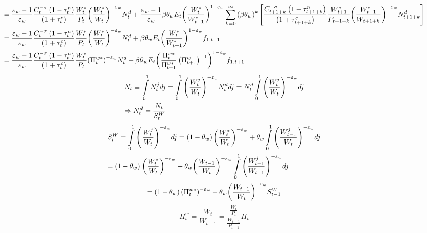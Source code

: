 \documentclass[12pt,a4paper]{article}
\begin{document}
\[\begin{gathered}
   = \frac{{{\varepsilon _w} - 1}}{{{\varepsilon _w}}}\frac{{C_t^{ - \sigma }\left( {1 - \tau _t^n} \right)}}{{\left( {1 + \tau _t^c} \right)}}\frac{{W_t^*}}{{{P_t}}}{\left( {\frac{{W_t^*}}{{{W_t}}}} \right)^{ - {\varepsilon _w}}}N_t^d + \frac{{{\varepsilon _w} - 1}}{{{\varepsilon _w}}}\beta {\theta _w}{E_t}{\left( {\frac{{W_t^*}}{{W_{t + 1}^*}}} \right)^{1 - {\varepsilon _w}}}\sum\limits_{k = 0}^\infty  {{{\left( {\beta {\theta _w}} \right)}^k}} \left[ {\frac{{C_{t + 1 + k}^{ - \sigma }\left( {1 - \tau _{t + 1 + k}^n} \right)}}{{\left( {1 + \tau _{t + 1 + k}^c} \right)}}\frac{{W_{t + 1}^*}}{{{P_{t + 1 + k}}}}{{\left( {\frac{{W_{t + 1}^*}}{{{W_{t + 1 + k}}}}} \right)}^{ - {\varepsilon _w}}}N_{t + 1 + k}^d} \right] \hfill \\
   = \frac{{{\varepsilon _w} - 1}}{{{\varepsilon _w}}}\frac{{C_t^{ - \sigma }\left( {1 - \tau _t^n} \right)}}{{\left( {1 + \tau _t^c} \right)}}\frac{{W_t^*}}{{{P_t}}}{\left( {\frac{{W_t^*}}{{{W_t}}}} \right)^{ - {\varepsilon _w}}}N_t^d + \beta {\theta _w}{E_t}{\left( {\frac{{W_t^*}}{{W_{t + 1}^*}}} \right)^{1 - {\varepsilon _w}}}{f_{1,t + 1}} \hfill \\
   = \frac{{{\varepsilon _w} - 1}}{{{\varepsilon _w}}}\frac{{C_t^{ - \sigma }\left( {1 - \tau _t^n} \right)}}{{\left( {1 + \tau _t^c} \right)}}\frac{{W_t^*}}{{{P_t}}}{\left( {\Pi _t^{w*}} \right)^{ - {\varepsilon _w}}}N_t^d + \beta {\theta _w}{E_t}{\left( {\frac{{\Pi _t^{w*}}}{{\Pi _{t + 1}^{w*}}}\left(\Pi _{t + 1}^w\right)^{-1}} \right)^{1 - {\varepsilon _w}}}{f_{1,t + 1}}\hfill \\
\end{gathered} \]
\[\begin{gathered}
  {N_t} \equiv \int\limits_0^1 {N_t^j} dj = \int\limits_0^1 {{{\left( {\frac{{W_t^j}}{{{W_t}}}} \right)}^{ - {\varepsilon _w}}}N_t^d} dj = N_t^d\int\limits_0^1 {{{\left( {\frac{{W_t^j}}{{{W_t}}}} \right)}^{ - {\varepsilon _w}}}} dj \hfill \\
   \Rightarrow N_t^d = \frac{{{N_t}}}{{S_t^W}} \hfill \\
\end{gathered} \]
\[\begin{gathered}
  S_t^W = \int\limits_0^1 {{{\left( {\frac{{W_t^j}}{{{W_t}}}} \right)}^{ - {\varepsilon _w}}}dj}  = \left( {1 - \theta_w } \right){\left( {\frac{{W_t^*}}{{{W_t}}}} \right)^{ - {\varepsilon _w}}} + \theta_w \int\limits_0^1 {{{\left( {\frac{{W_{t - 1}^j}}{{{W_t}}}} \right)}^{ - {\varepsilon _w}}}dj}\\ = \left( {1 - \theta_w } \right){\left( {\frac{{W_t^*}}{{{W_t}}}} \right)^{ - {\varepsilon _w}}} + \theta_w {\left( {\frac{{{W_{t - 1}}}}{{{W_t}}}} \right)^{ - {\varepsilon _w}}}\int\limits_0^1 {{{\left( {\frac{{W_{t - 1}^j}}{{{W_{t - 1}}}}} \right)}^{ - {\varepsilon _w}}}dj}  \hfill \\
   = \left( {1 - \theta_w } \right){\left( {\Pi _t^{w*}} \right)^{ - {\varepsilon _w}}} + \theta_w {\left( {\frac{{{W_{t - 1}}}}{{{W_t}}}} \right)^{ - {\varepsilon _w}}}S_{t - 1}^W
\end{gathered} \]
\[\Pi _t^w = \frac{{{W_t}}}{{{W_{t - 1}}}} = \frac{{\frac{{{W_t}}}{{{P_t}}}}}{{\frac{{{W_{t - 1}}}}{{{P_{t - 1}}}}}}{\Pi _t}\]
\end{document}
